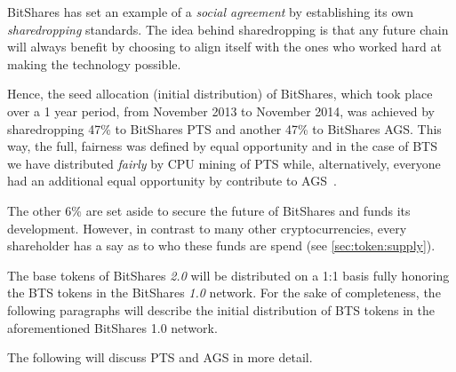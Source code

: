 BitShares has set an example of a \emph{social agreement} by establishing its
own \emph{sharedropping} standards. The idea behind sharedropping is that any
future chain will always benefit by choosing to align itself with the ones who
worked hard at making the technology possible.

Hence, the seed allocation (initial distribution) of BitShares, which took
place over a 1 year period, from November 2013 to November 2014, was achieved
by sharedropping 47\% to BitShares PTS and another 47\% to BitShares AGS.
%
This way, the full, fairness was defined by equal opportunity and in the case
of BTS we have distributed \emph{fairly} by CPU mining of PTS while,
alternatively, everyone had an additional equal opportunity by contribute to
AGS~\cite{}.

The other 6\% are set aside to secure the future of BitShares and funds its
development. However, in contrast to many other cryptocurrencies, every
shareholder has a say as to who these funds are spend (see
\cref{sec:token:supply}).

The base tokens of BitShares \emph{2.0} will be distributed on a 1:1 basis
fully honoring the BTS tokens in the BitShares \emph{1.0} network.  For the
sake of completeness, the following paragraphs will describe the initial
distribution of BTS tokens in the aforementioned BitShares 1.0 network.

The following will discuss PTS and AGS in more detail.
